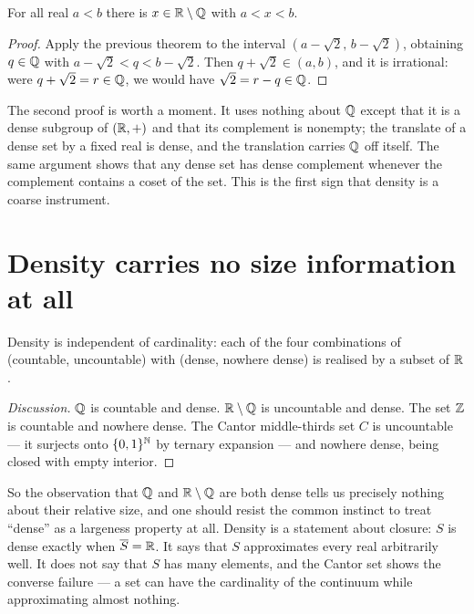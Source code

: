\documentclass{essay}
\newcommand{\Irr}{\R \setminus \Q}
\begin{document}
\begin{theorem}[Density of \(\Irr\)]
  For all real \(a < b\) there is \(x \in \Irr\) with \(a < x < b\).
\end{theorem}

\begin{proof}
  Apply the previous theorem to the interval \((a - \sqrt{2},\, b -
  \sqrt{2})\), obtaining \(q \in \mathbb{Q}\) with \(a - \sqrt{2} < q < b -
  \sqrt{2}\). Then \(q + \sqrt{2} \in (a,b)\), and it is irrational: were
  \(q + \sqrt{2} = r \in \mathbb{Q}\), we would have \(\sqrt{2} = r - q \in \mathbb{Q}\).
\end{proof}

The second proof is worth a moment. It uses nothing about \(\mathbb{Q}\) except
that it is a dense subgroup of \((\mathbb{R},+)\) and that its complement is
nonempty; the translate of a dense set by a fixed real is dense, and
the translation carries \(\mathbb{Q}\) off itself. The same argument shows that
any dense set has dense complement whenever the complement contains a
coset of the set. This is the first sign that density is a coarse
instrument.

\section{Density carries no size information at all}

\begin{proposition}
  Density is independent of cardinality: each of the four combinations of
  (countable, uncountable) with (dense, nowhere dense) is realised by a
  subset of \(\mathbb{R}\).
\end{proposition}

\begin{proof}[Discussion]
  \(\mathbb{Q}\) is countable and dense. \(\Irr\) is uncountable and dense. The set
  \(\mathbb{Z}\) is countable and nowhere dense. The Cantor middle-thirds set \(C\)
  is uncountable --- it surjects onto \(\{0,1\}^{\mathbb{N}}\) by ternary
  expansion --- and nowhere dense, being closed with empty interior.
\end{proof}

So the observation that \(\mathbb{Q}\) and \(\Irr\) are both dense tells us
precisely nothing about their relative size, and one should resist the
common instinct to treat ``dense'' as a largeness property at all.
Density is a statement about closure: \(S\) is dense exactly when
\(\overline{S} = \mathbb{R}\). It says that \(S\) approximates every real
arbitrarily well. It does not say that \(S\) has many elements, and the
Cantor set shows the converse failure --- a set can have the
cardinality of the continuum while approximating almost nothing.
\end{document}
